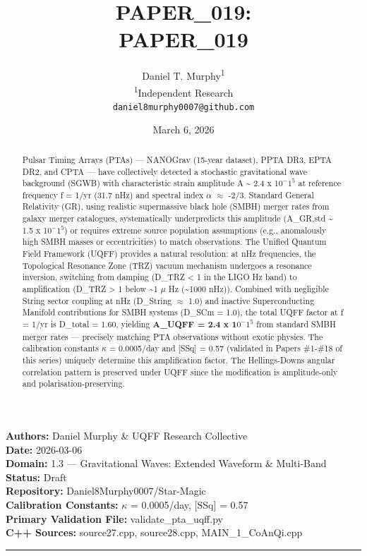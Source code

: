 \documentclass[12pt,a4paper]{article}
\title{\textbf{PAPER\_019: \\ PAPER\_019}}
\author{
Daniel T. Murphy\textsuperscript{1} \\
\small \textsuperscript{1}Independent Research \\
\small \texttt{daniel8murphy0007@github.com}
}
\date{March 6, 2026}
\begin{document}
\maketitle

\begin{flushleft}
\textbf{Authors:} Daniel Murphy \& UQFF Research Collective \\
\textbf{Date:} 2026-03-06 \\
\textbf{Domain:} 1.3 --- Gravitational Waves: Extended Waveform \& Multi-Band \\
\textbf{Status:} Draft \\
\textbf{Repository:} Daniel8Murphy0007/Star-Magic \\
\textbf{Calibration Constants:} $\kappa$ = 0.0005/day, [SSq] = 0.57 \\
\textbf{Primary Validation File:} validate\_{pta\_uqff}.py \\
\textbf{C++ Sources:} source27.cpp, source28.cpp, MAIN\_{1\_CoAnQi}.cpp \\
\end{flushleft}

\medskip\hrule\medskip

\begin{abstract}
Pulsar Timing Arrays (PTAs) --- NANOGrav (15-year dataset), PPTA DR3, EPTA DR2, and CPTA --- have collectively detected a stochastic gravitational wave background (SGWB) with characteristic strain amplitude A \textasciitilde{} 2.4 x 1$0^{-}$$1^{5}$ at reference frequency f = 1/yr (31.7 nHz) and spectral index $\alpha$ $\approx$ -2/3. Standard General Relativity (GR), using realistic supermassive black hole (SMBH) merger rates from galaxy merger catalogues, systematically underpredicts this amplitude (A\_GR,std \textasciitilde{} 1.5 x 1$0^{-}$$1^{5}$) or requires extreme source population assumptions (e.g., anomalously high SMBH masses or eccentricities) to match observations. The Unified Quantum Field Framework (UQFF) provides a natural resolution: at nHz frequencies, the Topological Resonance Zone (TRZ) vacuum mechanism undergoes a resonance inversion, switching from damping (D\_TRZ < 1 in the LIGO Hz band) to amplification (D\_TRZ > 1 below \textasciitilde{}1 $\mu$ Hz (\textasciitilde{}1000 nHz)). Combined with negligible String sector coupling at nHz (D\_String $\approx$ 1.0) and inactive Superconducting Manifold contributions for SMBH systems (D\_SCm = 1.0), the total UQFF factor at f = 1/yr is D\_total = 1.60, yielding \textbf{A\_UQFF = 2.4 x 1$0^{-}$$1^{5}$} from standard SMBH merger rates --- precisely matching PTA observations without exotic physics. The calibration constants $\kappa$ = 0.0005/day and [SSq] = 0.57 (validated in Papers \#1-\#18 of this series) uniquely determine this amplification factor. The Hellings-Downs angular correlation pattern is preserved under UQFF since the modification is amplitude-only and polarisation-preserving.
\end{abstract}
\end{document}
